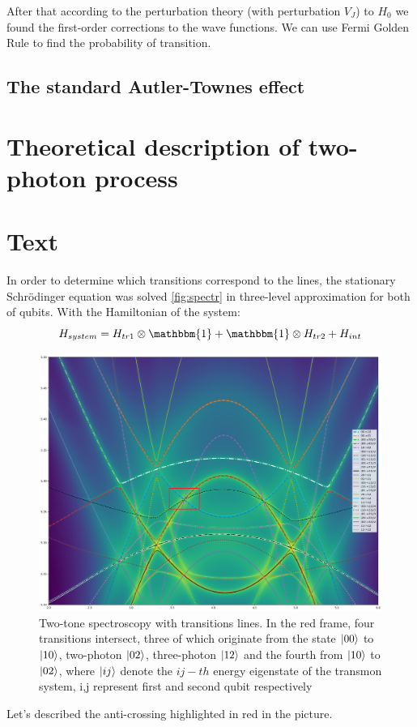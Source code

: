 \documentclass[%
 aip,
 amsmath,amssymb,
 reprint,%
]{revtex4-1}
\begin{document}
After that according to the perturbation theory (with perturbation $V_J$) to $H_0$ we found the first-order corrections to the wave functions. We can use Fermi Golden Rule to find the probability of transition.
\appendix

\subsection{The standard Autler-Townes effect}



\section{Theoretical description of two-photon process}





\section{Text}


In order to determine which transitions correspond to the lines, the stationary Schrödinger equation was solved \autoref{fig:spectr} in three-level approximation for both of qubits. With the Hamiltonian of the system:
\begin{equation}
	H_{system} = H_{tr1}\otimes\mathbbm{1}+\mathbbm{1}\otimes H_{tr2}+H_{int}
\end{equation}
\begin{figure}[h]
	\centering
	\includegraphics[width=\linewidth]{spectr}
	\caption{Two-tone spectroscopy with transitions lines. In the red frame, four transitions intersect, three of which originate from the state $\ket{00}$ to $\ket{10}$, two-photon
		$\ket{02}$, three-photon
		$\ket{12}$ and the fourth from  $\ket{10}$ to  $\ket{02}$, where $\ket{ij}$ denote the $ij-th$ energy eigenstate of the transmon system, i,j represent first and second qubit respectively}
	\label{fig:spectr}
\end{figure}


 Let's described the anti-crossing highlighted in red in the picture. 
 



\end{document}
